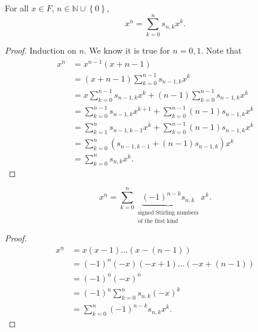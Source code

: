 \begin{proposition} \label{prop: a summation formula for first kind of striling number}
    For all \(x \in F\), \(n \in \mathbb{N} \cup \left\{ 0 \right\} \), 
    \[
        x^{\overline{n} }= \sum_{k=0}^n s_{n,k} x^k. 
    \]  
\end{proposition}
\begin{proof}
    Induction on \(n\). We know it is true for \(n=0,1\). Note that 
    \begin{align*}
        x^{\overline{n} } &= x^{\overline{n-1}}(x+n-1) \\
        &= (x+n-1) \sum_{k=0}^{n-1} s_{n-1,k} x^k \\
        &= x \sum_{k=0}^{n-1}s_{n-1,k} x^k + (n-1) \sum_{k=0}^{n-1} s_{n-1, k} x^k \\
        &= \sum_{k=0}^{n-1} s_{n-1,k} x^{k+1} + \sum_{k=0}^{n-1}(n-1)s_{n-1,k}x^k \\
        &= \sum_{k=1}^n s_{n-1, k-1} x^{k} + \sum_{k=0}^{n-1}(n-1)s_{n-1,k}x^k \\
        &= \sum_{k=0}^n \left( s_{n-1,k-1}+(n-1)s_{n-1,k} \right) x^k \\
        &= \sum_{k=0}^n s_{n,k} x^k.          
    \end{align*} 
\end{proof}

\begin{corollary}
    \[
         x^{\underline{n}} = \sum_{k=0}^n \underbrace{(-1)^{n-k} s_{n,k}}_{\substack{\text{signed Stirling numbers} \\ \text{of the first kind}}}x^k .
    \]
\end{corollary}
\begin{proof}
    \begin{align*}
        x^{\underline{n}} &= x(x-1)\dots (x-(n-1)) \\
        &= (-1)^n (-x)(-x+1)\dots (-x+(n-1)) \\
        &=(-1)^n (-x)^{\overline{n} } \\
        &= (-1)^n \sum_{k=0}^n s_{n,k}(-x)^k \\
        &= \sum_{k=0}^n (-1)^{n-k} s_{n,k} x^k. 
    \end{align*}
\end{proof}